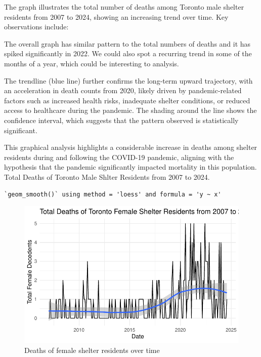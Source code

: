 \documentclass[
  letterpaper,
  DIV=11,
  numbers=noendperiod]{scrartcl}
\begin{document}
The graph illustrates the total number of deaths among Toronto male
shelter residents from 2007 to 2024, showing an increasing trend over
time. Key observations include:

The overall graph has similar pattern to the total numbers of deaths and
it has spiked significantly in 2022. We could also spot a recurring
trend in some of the months of a year, which could be interesting to
analysis.

The trendline (blue line) further confirms the long-term upward
trajectory, with an acceleration in death counts from 2020, likely
driven by pandemic-related factors such as increased health risks,
inadequate shelter conditions, or reduced access to healthcare during
the pandemic. The shading around the line shows the confidence interval,
which suggests that the pattern observed is statistically significant.

This graphical analysis highlights a considerable increase in deaths
among shelter residents during and following the COVID-19 pandemic,
aligning with the hypothesis that the pandemic significantly impacted
mortality in this population. Total Deaths of Toronto Male Shlter
Residents from 2007 to 2024.

\begin{verbatim}
`geom_smooth()` using method = 'loess' and formula = 'y ~ x'
\end{verbatim}

\begin{figure}

{\centering \includegraphics{paper_files/figure-pdf/fig-female_decedents-1.pdf}

}

\caption{\label{fig-female_decedents}Deaths of female shelter residents
over time}

\end{figure}
\end{document}
